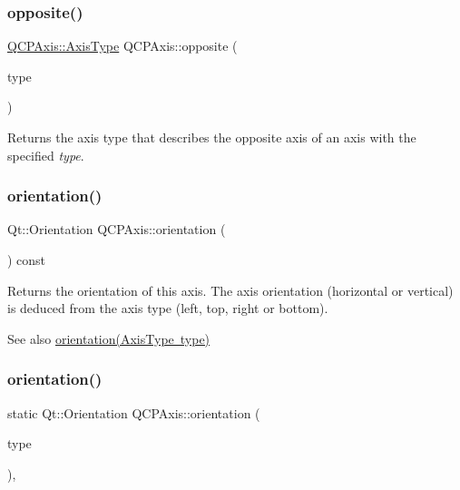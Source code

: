 \subsubsection{\texorpdfstring{opposite()}{opposite()}}
{\footnotesize\ttfamily \mbox{\hyperlink{class_q_c_p_axis_ae2bcc1728b382f10f064612b368bc18a}{Q\+C\+P\+Axis\+::\+Axis\+Type}} Q\+C\+P\+Axis\+::opposite (\begin{DoxyParamCaption}\item[{\mbox{\hyperlink{class_q_c_p_axis_ae2bcc1728b382f10f064612b368bc18a}{Q\+C\+P\+Axis\+::\+Axis\+Type}}}]{type }\end{DoxyParamCaption})\hspace{0.3cm}{\ttfamily [static]}}

Returns the axis type that describes the opposite axis of an axis with the specified {\itshape type}. \mbox{\label{class_q_c_p_axis_ab988ef4538e2655bb77bd138189cd42e}} 
\subsubsection{\texorpdfstring{orientation()}{orientation()}\hspace{0.1cm}{\footnotesize\ttfamily [1/2]}}
{\footnotesize\ttfamily Qt\+::\+Orientation Q\+C\+P\+Axis\+::orientation (\begin{DoxyParamCaption}{ }\end{DoxyParamCaption}) const\hspace{0.3cm}{\ttfamily [inline]}}

Returns the orientation of this axis. The axis orientation (horizontal or vertical) is deduced from the axis type (left, top, right or bottom).

\begin{DoxySeeAlso}{See also}
\mbox{\hyperlink{class_q_c_p_axis_a9a68b3e45f1b1e33d4d807822342516c}{orientation(\+Axis\+Type type)}} 
\end{DoxySeeAlso}
\mbox{\label{class_q_c_p_axis_a9a68b3e45f1b1e33d4d807822342516c}} 
\subsubsection{\texorpdfstring{orientation()}{orientation()}\hspace{0.1cm}{\footnotesize\ttfamily [2/2]}}
{\footnotesize\ttfamily static Qt\+::\+Orientation Q\+C\+P\+Axis\+::orientation (\begin{DoxyParamCaption}\item[{\mbox{\hyperlink{class_q_c_p_axis_ae2bcc1728b382f10f064612b368bc18a}{Axis\+Type}}}]{type }\end{DoxyParamCaption})\hspace{0.3cm}{\ttfamily [inline]}, {\ttfamily [static]}}


